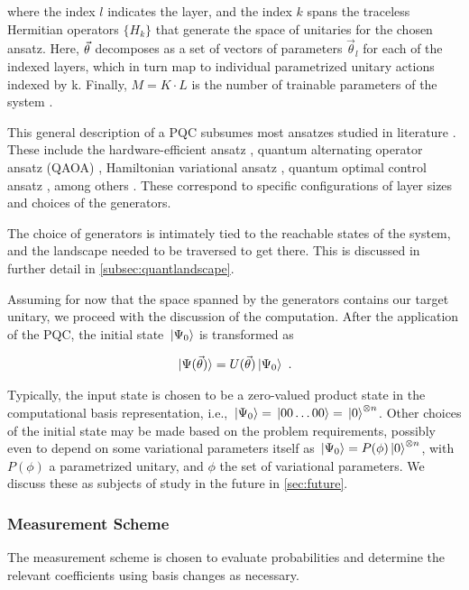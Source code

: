 where the index \(l\) indicates the layer, and the index \(k\) spans the
traceless Hermitian operators \(\{H_k\}\) that generate the space of unitaries
for the chosen ansatz. Here, \(\vec{\theta}\) decomposes as a set of vectors of
parameters \(\vec{\theta}_l\) for each of the indexed layers, which in turn map
to individual parametrized unitary actions indexed by k. Finally, \(M = K \cdot
L\) is the number of trainable parameters of the system \cite[see][section
II.A]{larocca2021theory}.

This general description of a PQC subsumes most ansatzes studied in literature
\cite{larocca2021diagnosing}. These include the hardware-efficient ansatz
\cite{kandala2017hardware}, quantum alternating operator ansatz (QAOA)
\cite{farhi2014quantum}, Hamiltonian variational ansatz
\cite{wecker2015progress}, quantum optimal control ansatz
\cite{choquette2021quantum}, among others \cite{hadfield2019quantum,
zhu2020adaptive, lee2021progress}. These correspond to specific configurations
of layer sizes and choices of the generators.

The choice of generators is intimately tied to the reachable states of the
system, and the landscape needed to be traversed to get there. This is discussed
in further detail in \autoref{subsec:quantlandscape}.

Assuming for now that the space spanned by the generators contains our target
unitary, we proceed with the discussion of the computation. After the
application of the PQC, the initial state \(\ket*{\Psi_0}\) is transformed as

\begin{gather}
    \ket*{\Psi(\vec{\theta})} = U(\vec{\theta})\ket*{\Psi_0}~.
\end{gather}

Typically, the input state is chosen to be a zero-valued product state in the
computational basis representation, i.e., \(\ket*{\Psi_0} = \ket*{00\ldots 00} =
\ket*{0}^{\otimes n}\). Other choices of the initial state may be made based on
the problem requirements, possibly even to depend on some variational parameters
itself as \(\ket*{\Psi_0} = P(\phi) \ket*{0}^{\otimes n}\), with \(P(\phi)\) a
parametrized unitary, and \(\phi\) the set of variational parameters. We discuss
these as subjects of study in the future in \autoref{sec:future}.

\subsubsection{Measurement Scheme}
The measurement scheme is chosen to evaluate probabilities and determine the
relevant coefficients using basis changes as necessary.

